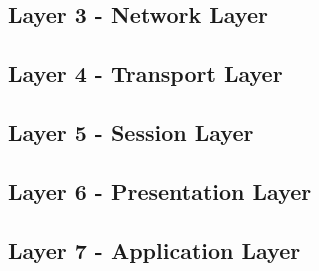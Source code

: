 \documentclass{article}
\begin{document}
\subsection{Layer 3 - Network Layer}
\subsection{Layer 4 - Transport Layer}
\subsection{Layer 5 - Session Layer}
\subsection{Layer 6 - Presentation Layer}
\subsection{Layer 7 - Application Layer}
\end{document}
